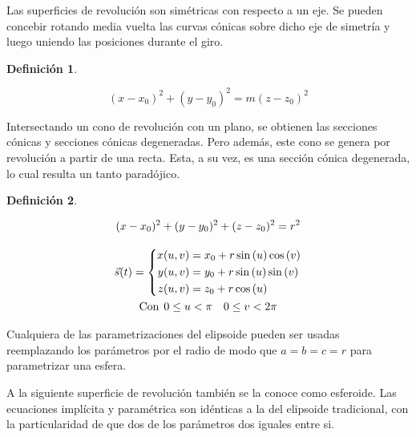 \documentclass[a5paper,12pt,twoside]{book}
\newtheorem{defn}{{Definición}}[chapter]
\begin{document}

Las superficies de revolución son simétricas con respecto a un eje.
Se pueden concebir rotando media vuelta las curvas cónicas sobre dicho eje de simetría y luego uniendo las posiciones durante el giro.

\begin{mdframed}[style=DefinitionFrame]
    \begin{defn}
    \end{defn}
    \begin{equation*}
        (x-x_0)^2 + (y-y_0)^2 = m\left(z-z_0\right)^2
    \end{equation*}
\end{mdframed}

Intersectando un cono de revolución con un plano, se obtienen las secciones cónicas y secciones cónicas degeneradas.
Pero además, este cono se genera por revolución a partir de una recta.
Esta, a su vez, es una sección cónica degenerada, lo cual resulta un tanto paradójico.

\begin{mdframed}[style=DefinitionFrame]
    \begin{defn}
    \end{defn}
    \begin{gather*}
        (x-x_0)^2 + (y-y_0)^2 + (z-z_0)^2 = r^2
        \\[1em]
        \Vec{s}(t) = \left\{
        \begin{aligned}
            x(u,v) &= x_0 + r \sin{(u)} \cos{(v)} \\
            y(u,v) &= y_0 + r \sin{(u)} \sin{(v)} \\
            z(u,v) &= z_0 + r \cos{(u)}
        \end{aligned}
        \right.
        \\
        \textrm{Con} \hspace{1ex} 0 \leq u < \pi \quad 0 \leq v < 2 \pi
    \end{gather*}
\end{mdframed}

Cualquiera de las parametrizaciones del elipsoide pueden ser usadas reemplazando los parámetros por el radio de modo que $a=b=c=r$ para parametrizar una esfera.

A la siguiente superficie de revolución también se la conoce como esferoide.
Las ecuaciones implícita y paramétrica son idénticas a la del elipsoide tradicional, con la particularidad de que dos de los parámetros dos iguales entre si.
\end{document}
